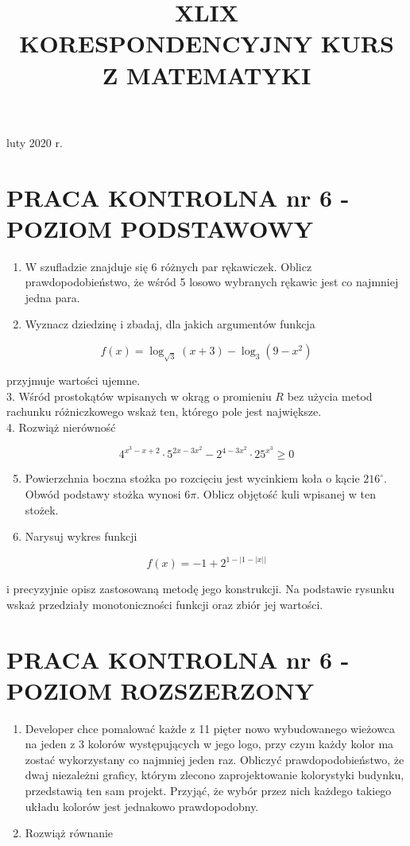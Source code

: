 \documentclass[10pt]{article}
\title{XLIX \\
 KORESPONDENCYJNY KURS \\
 Z MATEMATYKI }
\author{}
\date{}
\begin{document}
\maketitle
luty 2020 r.

\section*{PRACA KONTROLNA nr 6 - POZIOM PODSTAWOWY}
\begin{enumerate}
  \item W szufladzie znajduje się 6 różnych par rękawiczek. Oblicz prawdopodobieństwo, że wśród 5 losowo wybranych rękawic jest co najmniej jedna para.
  \item Wyznacz dziedzinę i zbadaj, dla jakich argumentów funkcja
\end{enumerate}

$$
f(x)=\log _{\sqrt{3}}(x+3)-\log _{3}\left(9-x^{2}\right)
$$

przyjmuje wartości ujemne.\\
3. Wśród prostokątów wpisanych w okrąg o promieniu $R$ bez użycia metod rachunku różniczkowego wskaż ten, którego pole jest największe.\\
4. Rozwiąż nierówność

$$
4^{x^{3}-x+2} \cdot 5^{2 x-3 x^{2}}-2^{4-3 x^{2}} \cdot 25^{x^{3}} \geqslant 0
$$

\begin{enumerate}
  \setcounter{enumi}{4}
  \item Powierzchnia boczna stożka po rozcięciu jest wycinkiem koła o kącie $216^{\circ}$. Obwód podstawy stożka wynosi $6 \pi$. Oblicz objętość kuli wpisanej w ten stożek.
  \item Narysuj wykres funkcji
\end{enumerate}

$$
f(x)=-1+2^{1-|1-|x||}
$$

i precyzyjnie opisz zastosowaną metodę jego konstrukcji. Na podstawie rysunku wskaż przedziały monotoniczności funkcji oraz zbiór jej wartości.

\section*{PRACA KONTROLNA nr 6 - POZIOM ROZSZERZONY}
\begin{enumerate}
  \item Developer chce pomalować każde z 11 pięter nowo wybudowanego wieżowca na jeden z 3 kolorów występujących w jego logo, przy czym każdy kolor ma zostać wykorzystany co najmniej jeden raz. Obliczyć prawdopodobieństwo, że dwaj niezależni graficy, którym zlecono zaprojektowanie kolorystyki budynku, przedstawią ten sam projekt. Przyjąć, że wybór przez nich każdego takiego układu kolorów jest jednakowo prawdopodobny.
  \item Rozwiąż równanie
\end{enumerate}
\end{document}
